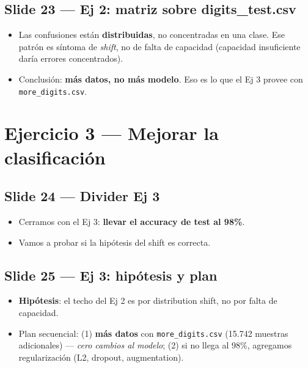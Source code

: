 \documentclass[11pt,a4paper]{article}
\begin{document}
\subsection{Slide 23 — Ej 2: matriz sobre digits\_test.csv}

\begin{decir}
\begin{itemize}[leftmargin=*,topsep=0pt]
  \item Las confusiones están \textbf{distribuidas}, no concentradas en una clase.
        Ese patrón es síntoma de \emph{shift}, no de falta de capacidad
        (capacidad insuficiente daría errores concentrados).
  \item Conclusión: \textbf{más datos, no más modelo}. Eso es lo que el Ej 3
        provee con \texttt{more\_digits.csv}.
\end{itemize}
\end{decir}

\section{Ejercicio 3 — Mejorar la clasificación}

\subsection{Slide 24 — Divider Ej 3}

\begin{decir}
\begin{itemize}[leftmargin=*,topsep=0pt]
  \item Cerramos con el Ej 3: \textbf{llevar el accuracy de test al 98\%}.
  \item Vamos a probar si la hipótesis del shift es correcta.
\end{itemize}
\end{decir}

\subsection{Slide 25 — Ej 3: hipótesis y plan}

\begin{decir}
\begin{itemize}[leftmargin=*,topsep=0pt]
  \item \textbf{Hipótesis}: el techo del Ej 2 es por distribution shift, no por
        falta de capacidad.
  \item Plan secuencial: (1) \textbf{más datos} con \texttt{more\_digits.csv}
        (15.742 muestras adicionales) — \emph{cero cambios al modelo}; (2) si
        no llega al 98\%, agregamos regularización (L2, dropout, augmentation).
\end{itemize}
\end{decir}
\end{document}
